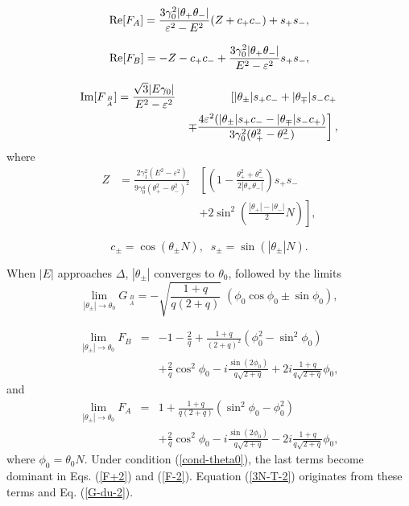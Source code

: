 \documentclass{jpsj3}
\begin{document}
\begin{equation}
{\rm Re} [F_A]
=\frac{3\gamma_0^2|\theta_+\theta_-|}{\varepsilon^2-E^2}
(Z+c_+c_-) +s_+s_-,
\label{ReFA}
\end{equation}

\begin{equation}
{\rm Re} [F_B] 
=
-Z -c_+c_- + \frac{3\gamma_0^2|\theta_+\theta_-|}{E^2-\varepsilon^2}s_+s_-,
\label{ReFB}
\end{equation}

\begin{eqnarray}
{\rm Im} [ F_{\;_A^B}]
&=
\frac{\sqrt{3}|E\gamma_0|}{E^2-\varepsilon^2}
&
\left[ 
|\theta_\pm| s_+c_-+ |\theta_\mp| s_-c_+ \right.
\nonumber \\
&& \left. \mp
\frac{4\varepsilon^2(|\theta_\pm| s_+c_-- |\theta_\mp| s_-c_+)}
{3\gamma_0^2(\theta_+^2-\theta_-^2)}
\right],
\label{ImF} 
\end{eqnarray}
where
\begin{eqnarray}
Z
&=
\frac{2\gamma_1^2(E^2-\varepsilon^2)}
{9\gamma_0^4(\theta_+^2-\theta_-^2)^2}
&
\left[
\left(
1-\frac{\theta_+^2+\theta_-^2}{2|\theta_+\theta_-|}
\right)s_+s_- \right.
\nonumber \\
&& \left. + 2\sin^2\left(\frac{|\theta_+|-|\theta_-|}{2}N\right)
\right],
\label{Z}
\end{eqnarray}

\begin{equation}
c_\pm=\cos(\theta_\pm N),\;\;
s_\pm=\sin(|\theta_\pm|N).
\label{app-cs}
\end{equation}

When $|E|$ approaches $\Delta$, 
$|\theta_\pm|$ converges to $\theta_0$, followed by the limits 
\begin{equation}
\lim_{|\theta_\pm| \rightarrow \theta_0 }
G_{\;_A^B}
= - \sqrt{\frac{1+q}{q(2+q)}}\;(
\phi_0\cos\phi_0\pm \sin\phi_0),
\label{G-du-2} 
\end{equation}


\begin{eqnarray}
\lim_{|\theta_\pm| \rightarrow \theta_0 }
F_B &= & 
-1-\frac{2}{q} 
+\frac{1+q}{(2+q)^2}(\phi_0^2-\sin^2\phi_0)
\nonumber \\
& & +\frac{2}{q}\cos^2\phi_0-i\frac{\sin (2\phi_0)}{q\sqrt{2+q}}+2i\frac{1+q}{q\sqrt{2+q}}\phi_0,
\label{F+2} 
\end{eqnarray}
and
\begin{eqnarray}
\lim_{|\theta_\pm| \rightarrow \theta_0 }
F_A &=& 
1 
+\frac{1+q}{q(2+q)}(\sin^2\phi_0-\phi_0^2)
\nonumber \\
& & 
+\frac{2}{q}\cos^2\phi_0
-i\frac{\sin(2\phi_0)}{q\sqrt{2+q}}-2i\frac{1+q}{q\sqrt{2+q}}\phi_0,
\label{F-2} 
\end{eqnarray}
where $\phi_0=\theta_0 N$. 
Under condition (\ref{cond-theta0}), 
the last terms become dominant
in Eqs. (\ref{F+2}) and (\ref{F-2}).
Equation (\ref{3N-T-2})
originates from
these terms and Eq. (\ref{G-du-2}).
\end{document}
